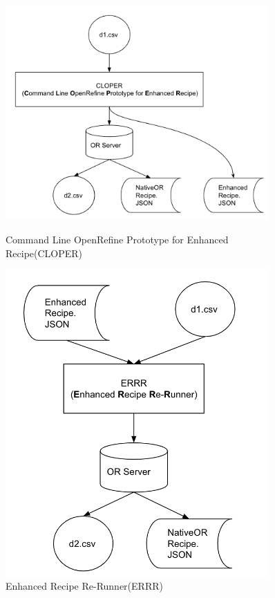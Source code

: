 \documentclass[runningheads]{llncs}
\begin{document}
\begin{figure}
    \centering
    \begin{minipage}{0.55\textwidth}
        \centering
        \includegraphics[width=0.9\textwidth]{figs/CLOPER.png} %
        \caption{Command Line OpenRefine Prototype for Enhanced Recipe(CLOPER)}\label{fig3}\centering
    \end{minipage}\hfill
    \begin{minipage}{0.4\textwidth}
        \centering
        \includegraphics[width=0.9\textwidth]{figs/ERRR.png} %
        \caption{Enhanced Recipe Re-Runner(ERRR)}\label{fig4}\centering
    \end{minipage}
\end{figure}
\end{document}
